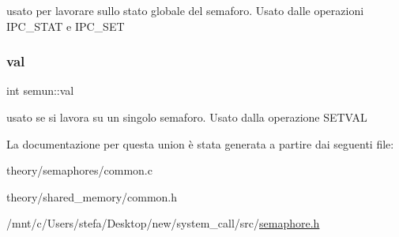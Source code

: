 usato per lavorare sullo stato globale del semaforo. Usato dalle operazioni I\+P\+C\+\_\+\+S\+T\+AT e I\+P\+C\+\_\+\+S\+ET \mbox{\label{unionsemun_ac6121ecb6d04a024e07e12bd71b94031}} 
\subsubsection{\texorpdfstring{val}{val}}
{\footnotesize\ttfamily int semun\+::val}

usato se si lavora su un singolo semaforo. Usato dalla operazione S\+E\+T\+V\+AL 

La documentazione per questa union è stata generata a partire dai seguenti file\+:\begin{DoxyCompactItemize}
\item 
theory/semaphores/common.\+c\item 
theory/shared\+\_\+memory/common.\+h\item 
/mnt/c/\+Users/stefa/\+Desktop/new/system\+\_\+call/src/\hyperlink{semaphore_8h}{semaphore.\+h}\end{DoxyCompactItemize}
